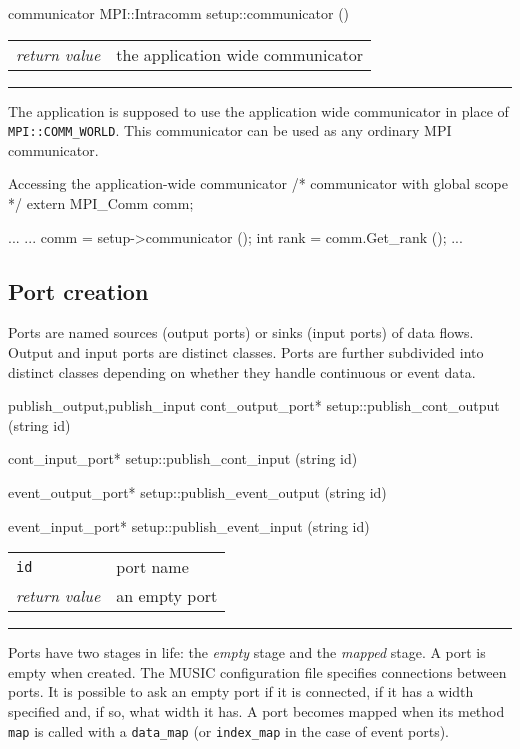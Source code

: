 \documentclass[a4paper]{report}
\makeatletter
\newenvironment{parameters}%
{\begin{tabular}{@{\hspace{2em}}lp{0.6\textwidth}}}%
{\end{tabular}\par\vspace{1mm}\par\hrule\par\vspace{5mm}}
\makeatother
\begin{document}
\begin{head}{communicator}
  MPI::Intracomm setup::communicator ()
\end{head}
\begin{parameters}
  \emph{return value} & the application wide communicator \\
\end{parameters}

The application is supposed to use the application wide communicator
in place of
\lstinline|MPI::COMM_WORLD|.
This communicator can be used as any ordinary MPI communicator.

\begin{code}{Accessing the application-wide communicator}
/* communicator with global scope */
extern MPI_Comm comm;

...
{
  ...
  comm = setup->communicator ();
  int rank = comm.Get_rank ();
  ...
}
\end{code}

\pagebreak
\subsection{Port creation}

Ports are named sources (output ports) or sinks (input
ports) of data flows.  Output and input ports are distinct classes.
Ports are further subdivided into distinct classes depending on
whether they handle continuous or event data.

\begin{head}{publish_output,publish_input}
  cont_output_port* setup::publish_cont_output (string id)

  cont_input_port* setup::publish_cont_input (string id)

  event_output_port* setup::publish_event_output (string id)

  event_input_port* setup::publish_event_input (string id)
\end{head}
\begin{parameters}
  \lstinline|id| & port name \\
  \emph{return value} & an empty port \\
\end{parameters}

Ports have two stages in life: the \emph{empty} stage and the
\emph{mapped} stage.  A port is empty when created.  The MUSIC
configuration file specifies connections between ports.  It is
possible to ask an empty port if it is connected, if it has a width
specified and, if so, what width it has.  A port becomes mapped when
its method \lstinline|map| is called with a \lstinline|data_map| (or
\lstinline|index_map| in the case of event ports).
\end{document}
